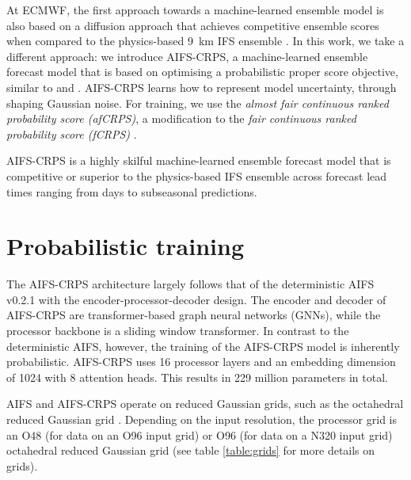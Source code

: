 \documentclass{article}
\begin{document}
At ECMWF, the first approach towards a machine-learned ensemble model is also based on a diffusion approach \citep{ensemble_blog, aifsensemblesNL2024} that achieves competitive ensemble scores when compared to the physics-based 9~km IFS ensemble \citep{lang81380}. In this work, we take a different approach: we introduce AIFS-CRPS, a machine-learned ensemble forecast model that is based on optimising a probabilistic proper score objective, similar to \cite{pacchiardi2024probabilistic, Shokar_2024} and \cite{kochkov2024neural}. AIFS-CRPS learns how to represent model uncertainty, through shaping Gaussian noise. For training, we use the \textit{almost fair continuous ranked probability score (afCRPS)}, a modification to the \textit{fair continuous ranked probability score (fCRPS)} \citep{Ferro_etal2008,Ferro2013,leutbecher2019}. 

AIFS-CRPS is a highly skilful machine-learned ensemble forecast model that is competitive or superior to the physics-based IFS ensemble across forecast lead times ranging from days to subseasonal predictions. 

\section{Probabilistic training}\label{sec:prob_training}
The AIFS-CRPS architecture largely follows that of the deterministic AIFS v0.2.1 \citep{lang2024aifs} with the encoder-processor-decoder design. The encoder and decoder of AIFS-CRPS are transformer-based graph neural networks (GNNs), while the processor backbone is a sliding window transformer. In contrast to the deterministic AIFS, however, the training of the AIFS-CRPS model is inherently probabilistic. AIFS-CRPS uses 16 processor layers and an embedding dimension of 1024 with 8 attention heads. This results in 229 million parameters in total.

AIFS and AIFS-CRPS operate on reduced Gaussian grids, such as the octahedral reduced Gaussian grid \citep{Wedi2014}.
Depending on the input resolution, the processor grid is an O48 (for data on an O96 input grid) or O96 (for data on a N320 input grid) 
octahedral reduced Gaussian grid (see table \ref{table:grids} for more details on grids).
\end{document}
